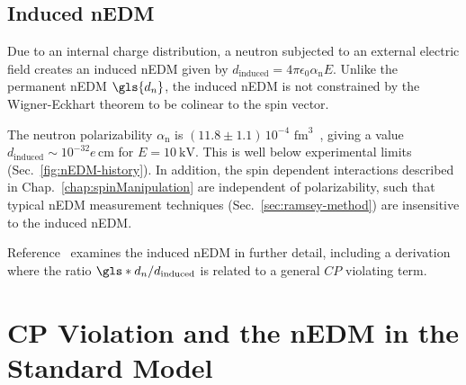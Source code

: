 
\subsection{Induced nEDM}


Due to an internal charge distribution, a neutron subjected to an external electric field creates an induced nEDM given by $d_\text{induced}=4\pi \epsilon_0 \alpha_\text{n} E$. Unlike the permanent nEDM $\gls{d_n}$, the induced nEDM is not constrained by the Wigner-Eckhart theorem to be colinear to the spin vector.

The neutron polarizability $\alpha_\text{n}$ is $(11.8\pm 1.1)\,10^{-4}\text{ fm}^3$~\cite{pdg2022}, giving a value $d_\text{induced}\sim 10^{-32}e\,\text{cm}$ for $E=\qty{10}{\kilo\volt}$. This is well below experimental limits (Sec.~\ref{fig:nEDM-history}). In addition, the spin dependent interactions described in Chap.~\ref{chap:spinManipulation} are independent of polarizability, such that typical nEDM measurement techniques (Sec.~\ref{sec:ramsey-method}) are insensitive to the induced nEDM. 

Reference~\cite{baym_elementary_2016} examines the induced nEDM in further detail, including a derivation where the ratio $\gls*{d_n}/d_\text{induced}$ is related to a general $CP$ violating term.


\section{CP Violation and the nEDM in the Standard Model}\label{sec:CP_violation_SM}


